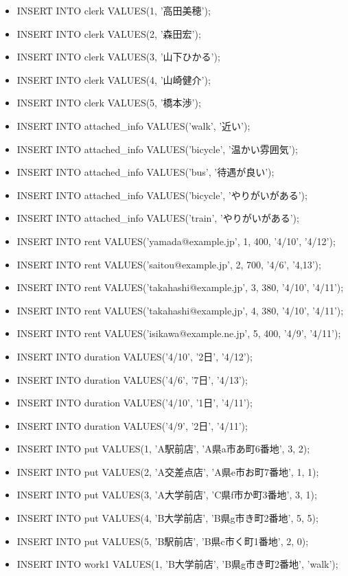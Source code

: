 \documentclass{jarticle}
\begin{document}
\begin{itemize}
\item INSERT INTO clerk VALUES(1, '高田美穂');
\item INSERT INTO clerk VALUES(2, '森田宏');
\item INSERT INTO clerk VALUES(3, '山下ひかる');
\item INSERT INTO clerk VALUES(4, '山崎健介');
\item INSERT INTO clerk VALUES(5, '橋本渉');
\item INSERT INTO attached\_info VALUES('walk', '近い');
\item INSERT INTO attached\_info VALUES('bicycle', '温かい雰囲気');
\item INSERT INTO attached\_info VALUES('bus', '待遇が良い');
\item INSERT INTO attached\_info VALUES('bicycle', 'やりがいがある');
\item INSERT INTO attached\_info VALUES('train', 'やりがいがある');
\item INSERT INTO rent VALUES('yamada@example.jp', 1, 400, '4/10', '4/12');
\item INSERT INTO rent VALUES('saitou@example.jp', 2, 700, '4/6', '4,13');
\item INSERT INTO rent VALUES('takahashi@example.jp', 3, 380, '4/10', '4/11');
\item INSERT INTO rent VALUES('takahashi@example,jp', 4, 380, '4/10', '4/11');
\item INSERT INTO rent VALUES('isikawa@example.ne.jp', 5, 400, '4/9', '4/11');
\item INSERT INTO duration VALUES('4/10', '2日', '4/12');
\item INSERT INTO duration VALUES('4/6', '7日', '4/13');
\item INSERT INTO duration VALUES('4/10', '1日', '4/11');
\item INSERT INTO duration VALUES('4/9', '2日', '4/11');
\item INSERT INTO put VALUES(1, 'A駅前店', 'A県a市あ町6番地', 3, 2);
\item INSERT INTO put VALUES(2, 'A交差点店', 'A県e市お町7番地', 1, 1);
\item INSERT INTO put VALUES(3, 'A大学前店', 'C県f市か町3番地', 3, 1);
\item INSERT INTO put VALUES(4, 'B大学前店', 'B県g市き町2番地', 5, 5);
\item INSERT INTO put VALUES(5, 'B駅前店', 'B県c市く町1番地', 2, 0);
\item INSERT INTO work1 VALUES(1, 'B大学前店', 'B県g市き町2番地', 'walk');

\end{itemize}
\end{document}

